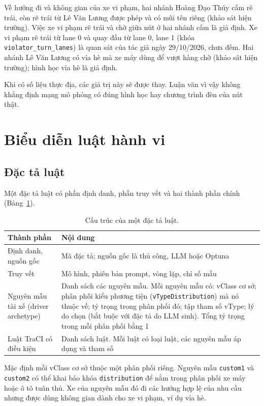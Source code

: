 \documentclass[../main.tex]{subfiles}
\begin{document}
Về hướng đi và không gian của xe vi phạm, hai nhánh Hoàng Đạo Thúy cấm rẽ trái, còn rẽ trái từ Lê Văn Lương được phép và có mũi tên riêng (khảo sát hiện trường). Việc xe vi phạm rẽ trái và chờ giữa nút ở hai nhánh cấm là giả định. Xe vi phạm rẽ trái từ lane 0 và quay đầu từ lane 0, lane 1 (khóa \texttt{violator\_turn\_lanes}) là quan sát của tác giả ngày 29/10/2026, chưa đếm. Hai nhánh Lê Văn Lương có vỉa hè mà xe máy dùng để vượt hàng chờ (khảo sát hiện trường); hình học vỉa hè là giả định.

Khi có số liệu thực địa, các giá trị này sẽ được thay. Luận văn vì vậy không khẳng định mạng mô phỏng có đúng hình học hay chương trình đèn của nút thật.

\section{Biểu diễn luật hành vi}
\label{section:3.3}

\subsection{Đặc tả luật}

Một đặc tả luật có phần định danh, phần truy vết và hai thành phần chính (Bảng~\ref{table:3.1a}).

\begin{table}[ht]
\centering
\small
\caption{Cấu trúc của một đặc tả luật.}
\label{table:3.1a}
\begin{tabular}{|p{3.4cm}|p{10.6cm}|}
\hline
\textbf{Thành phần} & \textbf{Nội dung} \\
\hline
Định danh, nguồn gốc & Mã đặc tả; nguồn gốc là thủ công, LLM hoặc Optuna \\
\hline
Truy vết & Mô hình, phiên bản prompt, vòng lặp, chỉ số mẫu \\
\hline
Nguyên mẫu tài xế (driver archetype) & Danh sách các nguyên mẫu. Mỗi nguyên mẫu có: vClass cơ sở; phân phối kiểu phương tiện (\texttt{vTypeDistribution}) mà nó thuộc về; tỷ trọng trong phân phối đó; tập tham số vType; lý do chọn (bắt buộc với đặc tả do LLM sinh). Tổng tỷ trọng trong mỗi phân phối bằng 1 \\
\hline
Luật TraCI có điều kiện & Danh sách luật. Mỗi luật có loại luật, các nguyên mẫu áp dụng và tham số \\
\hline
\end{tabular}
\end{table}

Mặc định mỗi vClass cơ sở thuộc một phân phối riêng. Nguyên mẫu \texttt{custom1} và \texttt{custom2} có thể khai báo khóa \texttt{distribution} để nằm trong phân phối xe máy hoặc ô tô tuân thủ. Xe của nguyên mẫu đó đi các hướng hợp lệ của nhu cầu nhưng được dùng không gian dành cho xe vi phạm, ví dụ vỉa hè.
\end{document}
